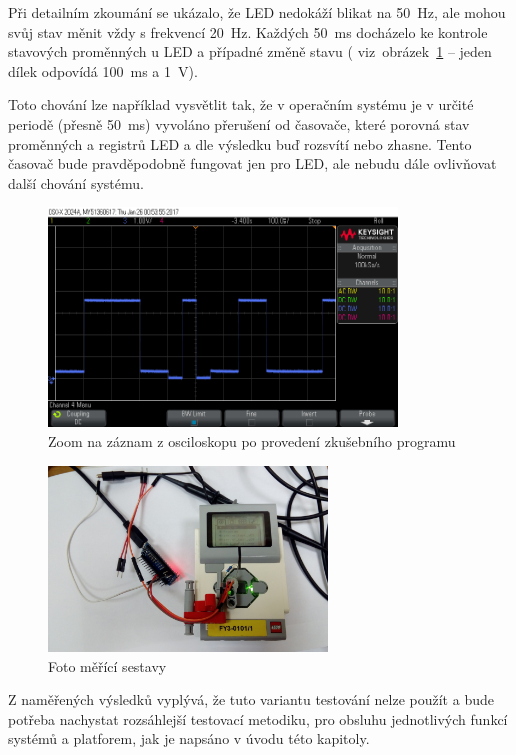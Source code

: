 Při detailním zkoumání se ukázalo, že LED nedokáží blikat na 50~Hz, ale mohou svůj stav měnit vždy s frekvencí 20~Hz. 
Každých 50~ms docházelo ke kontrole stavových proměnných u LED a případné změně stavu ( viz~obrázek~\ref{fig:measuring_lego-ev3_orig-soft_led-blinking_part1} -- jeden dílek odpovídá 100~ms a 1~V).


Toto chování lze například vysvětlit tak, že v operačním systému  je v určité periodě (přesně 50~ms) vyvoláno přerušení od časovače, které porovná stav proměnných a registrů LED a dle výsledku buď rozsvítí nebo zhasne. 
Tento časovač bude pravděpodobně fungovat jen pro LED, ale nebudu dále ovlivňovat další chování systému.
 
\begin{figure}[h]
	\centering
	\includegraphics[width=350px]{images/measuring-oscilloscope_ev3-software_led-blinking_part1.png}
	\caption[Zoom na záznam z osciloskopu po provedení zkušebního programu]{Zoom na záznam z osciloskopu po provedení zkušebního programu}
	\label{fig:measuring_lego-ev3_orig-soft_led-blinking_part1}
\end{figure}

\begin{figure}[h]
	\centering
	\includegraphics[width=280px]{images/measuring-system_photo.jpg}
	\caption[Foto měřící sestavy]{Foto měřící sestavy}
	\label{fig:measuring-system_photo}
\end{figure}

Z naměřených výsledků vyplývá, že tuto variantu testování nelze použít a bude potřeba nachystat rozsáhlejší testovací metodiku, pro obsluhu jednotlivých funkcí systémů a platforem, jak je napsáno v úvodu této kapitoly.